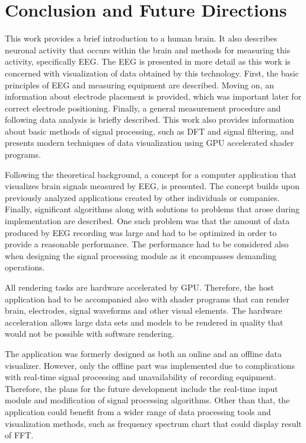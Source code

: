 \chapter{Conclusion and Future Directions}
This work provides a brief introduction to a human brain. It also describes
neuronal activity that occurs within the brain and methods for measuring this activity, specifically EEG. The EEG is presented in more detail as this work is concerned with visualization of data obtained by this technology. First, the basic principles of EEG and measuring equipment are described. Moving on, an information about electrode placement is provided, which was important later for correct electrode positioning. Finally, a general measurement procedure and following data analysis is briefly described. This work also provides information about basic methods of signal processing, such as DFT and signal filtering, and presents modern techniques of data visualization using GPU accelerated shader programs.

Following the theoretical background, a concept for a computer application that visualizes brain signals measured by EEG, is presented. The concept builds upon previously analyzed applications created by other individuals or companies. Finally, significant algorithms along with solutions to problems that arose during implementation are described. One such problem was that the amount of data produced by EEG recording was large and had to be optimized in order to provide a reasonable performance. The performance had to be considered also when designing the signal processing module as it encompasses demanding operations.

All rendering tasks are hardware accelerated by GPU. Therefore, the host application had to be accompanied also with shader programs that can render brain, electrodes, signal waveforms and other visual elements. The hardware acceleration allows large data sets and models to be rendered in quality that would not be possible with software rendering. 

The application was formerly designed as both an online and an offline data visualizer. However, only the offline part was implemented due to complications with real-time signal processing and unavailability of recording equipment. Therefore, the plans for the future development include the real-time input module and modification of signal processing algorithms. Other than that, the application could benefit from a wider range of data processing tools and visualization methods, such as frequency spectrum chart that could display result of FFT.



